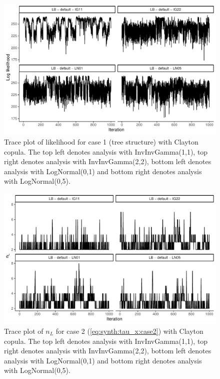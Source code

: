\documentclass{amsart}
\begin{document}
\begin{figure}
	\centering
	\includegraphics[width = 0.75\linewidth]{trace_case1_clayton_like.pdf}
	\caption{Trace plot of likelihood for case 1 (tree structure) with Clayton copula. The top left denotes analysis with InvInvGamma(1,1), top right denotes analysis with InvInvGamma(2,2), bottom left denotes analysis with LogNormal(0,1) and bottom right denotes analysis with LogNormal(0,5).}
	\label{fig:case1:clayton:like}
\end{figure}

\begin{figure}
	\centering
	\includegraphics[width = 0.75\linewidth]{trace_case2_clayton_nterm.pdf}
	\caption{Trace plot of $n_L$ for case 2 (\cref{eq:synth:tau_x:case2}) with Clayton copula. The top left denotes analysis with InvInvGamma(1,1), top right denotes analysis with InvInvGamma(2,2), bottom left denotes analysis with LogNormal(0,1) and bottom right denotes analysis with LogNormal(0,5).}
	\label{fig:case2:clayton:nterm}
\end{figure}
\end{document}
